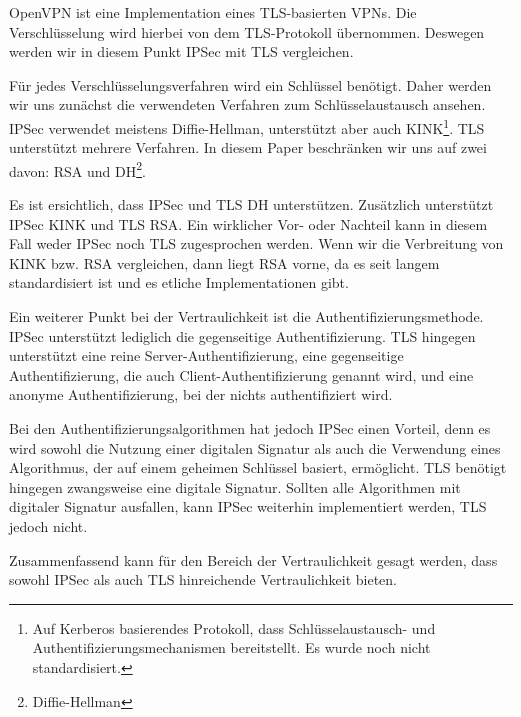 \documentclass[12pt]{scrartcl}
\begin{document}
OpenVPN ist eine Implementation eines TLS-basierten VPNs. Die Verschlüsselung wird hierbei von dem TLS-Protokoll übernommen. Deswegen werden wir in diesem Punkt IPSec mit TLS vergleichen.

Für jedes Verschlüsselungsverfahren wird ein Schlüssel benötigt. Daher werden wir uns zunächst die verwendeten Verfahren zum Schlüsselaustausch ansehen. IPSec verwendet meistens Diffie-Hellman, unterstützt aber auch KINK\footnote{Auf Kerberos basierendes Protokoll, dass Schlüsselaustausch- und Authentifizierungsmechanismen bereitstellt. Es wurde noch nicht standardisiert\cite{Alshamsi2005}.}. TLS unterstützt mehrere Verfahren. In diesem Paper beschränken wir uns auf zwei davon: RSA und DH\footnote{Diffie-Hellman}\cite{Alshamsi2005}. %


Es ist ersichtlich, dass IPSec und TLS DH unterstützen. Zusätzlich unterstützt IPSec KINK und TLS RSA. Ein wirklicher Vor- oder Nachteil kann in diesem Fall weder IPSec noch TLS zugesprochen werden. Wenn wir die Verbreitung von KINK bzw. RSA vergleichen, dann liegt RSA vorne, da es seit langem standardisiert ist und es etliche Implementationen gibt.

Ein weiterer Punkt bei der Vertraulichkeit ist die Authentifizierungsmethode. IPSec unterstützt lediglich die gegenseitige Authentifizierung. TLS hingegen unterstützt eine reine Server-Authentifizierung, eine gegenseitige Authentifizierung, die auch Client-Authentifizierung genannt wird, und eine anonyme Authentifizierung, bei der nichts authentifiziert wird.\cite{Alshamsi2005}

Bei den Authentifizierungsalgorithmen hat jedoch IPSec einen Vorteil, denn es wird sowohl die Nutzung einer digitalen Signatur als auch die Verwendung eines Algorithmus, der auf einem geheimen Schlüssel basiert, ermöglicht. TLS benötigt hingegen zwangsweise eine digitale Signatur. Sollten alle Algorithmen mit digitaler Signatur ausfallen, kann IPSec weiterhin implementiert werden, TLS jedoch nicht.\cite{Alshamsi2005}

Zusammenfassend kann für den Bereich der Vertraulichkeit gesagt werden, dass sowohl IPSec als auch TLS hinreichende Vertraulichkeit bieten.
\end{document}
